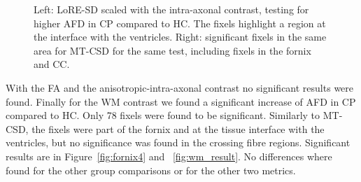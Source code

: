 \begin{figure}[h]
    \centering
    \hfill
    \caption{Left: LoRE-SD scaled with the intra-axonal contrast, testing for higher AFD in CP compared to HC. The fixels highlight a region at the interface with the ventricles. Right: significant fixels in the same area for MT-CSD for the same test, including fixels in the fornix and CC.}
    \label{fig:Lore_comp}
\end{figure}


With the FA and the anisotropic-intra-axonal contrast no significant results were found. Finally for the WM contrast we found a significant increase of AFD in CP compared to HC. Only 78 fixels were found to be significant. Similarly to MT-CSD, the fixels were part of the fornix and at the tissue interface with the ventricles, but no significance was found in the crossing fibre regions. Significant results are in Figure~\ref{fig:fornix4} and ~\ref{fig:wm_result}. No differences where found for the other group comparisons or for the other two metrics.


